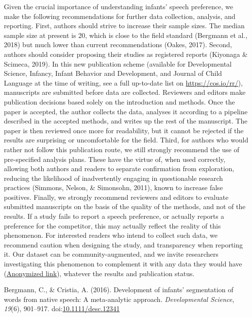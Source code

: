\documentclass[man]{apa6}
\begin{document}
Given the crucial importance of understanding infants' speech
preference, we make the following recommendations for further data
collection, analysis, and reporting. First, authors should strive to
increase their sample sizes. The median sample size at present is 20,
which is close to the field standard (Bergmann et al., 2018) but much
lower than current recommendations (Oakes, 2017). Second, authors should
consider proposing their studies as registered reports (Kiyonaga \&
Scimeca, 2019). In this new publication scheme (available for
Developmental Science, Infancy, Infant Behavior and Development, and
Journal of Child Language at the time of writing, see a full up-to-date
list on \url{https://cos.io/rr/}), manuscripts are submitted before data
are collected. Reviewers and editors make publication decisions based
solely on the introduction and methods. Once the paper is accepted, the
author collects the data, analyses it according to a pipeline described
in the accepted methods, and writes up the rest of the manuscript. The
paper is then reviewed once more for readability, but it cannot be
rejected if the results are surprising or uncomfortable for the field.
Third, for authors who would rather not follow this publication route,
we still strongly recommend the use of pre-specified analysis plans.
These have the virtue of, when used correctly, allowing both authors and
readers to separate confirmation from exploration, reducing the
likelihood of inadvertently engaging in questionable research practices
(Simmons, Nelson, \& Simonsohn, 2011), known to increase false
positives. Finally, we strongly recommend reviewers and editors to
evaluate submitted manuscripts on the basis of the quality of the
methods, and not of the results. If a study fails to report a speech
preference, or actually reports a preference for the competitor, this
may actually reflect the reality of this phenomenon. For interested
readers who intend to collect such data, we recommend caution when
designing the study, and transparency when reporting it. Our dataset can
be community-augmented, and we invite researchers investigating this
phenomenon to complement it with any data they would have
(\href{https://osf.io/4stz9/?view_only=d0696591ebf34bfc8430f848cd945ca8}{Anonymized
link}), whatever the results and publication status.

\newpage

\begingroup
\setlength{\parindent}{-0.5in} \setlength{\leftskip}{0.5in}

\hypertarget{refs}{}
\hypertarget{ref-bergmann_development_2016}{}
Bergmann, C., \& Cristia, A. (2016). Development of infants'
segmentation of words from native speech: A meta-analytic approach.
\emph{Developmental Science}, \emph{19}(6), 901--917.
doi:\href{https://doi.org/10.1111/desc.12341}{10.1111/desc.12341}
\end{document}
